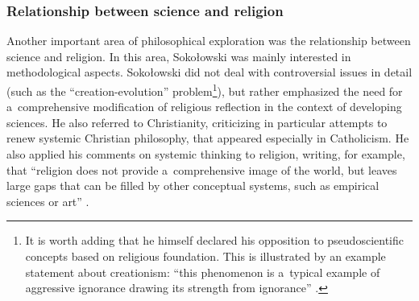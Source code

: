 \documentclass[%
  manuscript=article,
  year=2024,
  volume=77,
  doi=10.59203/zfn.77.689,
]{zfn}
\begin{document}
\subsubsection{Relationship between science and religion}



Another important area of philosophical exploration was the relationship between science and religion. In this area, Sokołowski was mainly interested in methodological aspects. Sokołowski did not deal with controversial issues in detail (such as the ``creation-evolution'' problem\footnote{It is worth adding that he himself declared his opposition to pseudoscientific concepts based on religious foundation. This is illustrated by an example statement about creationism: ``this phenomenon is a~typical example of aggressive ignorance drawing its strength from ignorance'' 
\parencite[][pp.259–260]{Sokoowski1991Posowie}.%
}), but rather emphasized the need for a~comprehensive modification of religious reflection in the context of developing sciences. He also referred to Christianity, criticizing in particular attempts to renew systemic Christian philosophy, that appeared especially in Catholicism. He also applied his comments on systemic thinking to religion, writing, for example, that ``religion does not provide a~comprehensive image of the world, but leaves large gaps that can be filled by other conceptual systems, such as empirical sciences or art''
\parencite[][p.199]{Sokoowski1989Gos}.%
\end{document}
